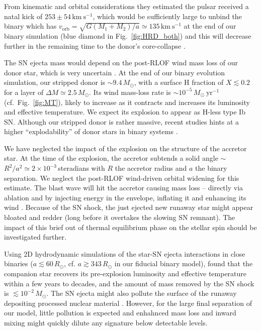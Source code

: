 \documentclass[twocolumn,twocolappendix,trackchanges]{aastex63}
\newcommand{\kms}{{\mathrm{km\ s^{-1}}}}
\DeclareRobustCommand{\Figref}[1]{Fig.~\ref{#1}}
\begin{document}
From kinematic and orbital considerations they estimated the pulsar
received a natal kick of
$253\pm54\,\kms$, which would be sufficiently large to unbind the
binary which has $v_\mathrm{orb}=\sqrt{G(M_1+M_2)/a}\simeq 135\,\kms$
at the end of our binary simulation (blue diamond in \Figref{fig:HRD_both}) and this will decrease further in the
remaining time to the donor's core-collapse \citep{kalogera:96,
  tauris:15}.

The SN ejecta mass would depend on the post-RLOF wind mass loss of our
donor star, which is very uncertain \citep[e.g.,][]{renzo:17, vink:17,
  gilkis:19}.  At the end of our binary evolution simulation, our
stripped donor is
$\sim$$9.4\,M_\odot$, with a surface H fraction of
$X\lesssim0.2$ for a layer of $\Delta M \simeq
2.5\,M_\odot$.  Its wind mass-loss rate is $\sim10^{-5}\,M_\odot \
\mathrm{yr^{-1}}$ (cf.~\Figref{fig:MT}), likely to increase as it contracts and increases its luminosity and effective temperature. We expect its explosion to appear as H-less type Ib SN. Although our stripped donor is rather massive, recent studies hints at a higher ``explodability'' of donor stars in binary systems \citep[e.g.,][]{schneider:21, laplace:21, vartanyan:21}.

We have neglected the impact of the explosion on the structure of the accretor star. At the time of the explosion, the accretor subtends a solid angle
$\sim$$R^2/a^2\simeq 2\times10^{-3}$\,steradians with $R$ the accretor
radius and $a$ the binary separation. We neglect the post-RLOF
wind-driven orbital widening for this estimate.  The blast wave will
hit the accretor causing mass loss -- directly via ablation and by
injecting energy in the envelope, inflating it and enhancing its wind
\citep{wheeler:75, tauris:98, podsiadlowski:03, hirai:18}.  Because of
the SN shock, the just ejected new runaway star might appear bloated
and redder (long before it overtakes the slowing SN remnant). The
impact of this brief out of thermal equilibrium phase on the stellar
spin should be investigated further.

Using 2D hydrodynamic simulations of the star-SN ejecta interactions in close binaries ($a\lesssim
60\,R_\odot$, cf. $a\gtrsim
343\,R_\odot$ in our fiducial binary model), \cite{hirai:18} found that the companion star recovers its pre-explosion luminosity and effective temperature within a few years to decades, and the amount of mass removed by the SN shock is
$\lesssim10^{-2}\,M_\odot$.  The SN ejecta might also pollute the surface of the runaway depositing processed nuclear material \citep[e.g.,][]{przybilla:08, suda:21}. However, for the large final separation of our model, little pollution is expected and enhahnced mass loss and inward mixing might quickly dilute any signature below detectable levels.
\end{document}
